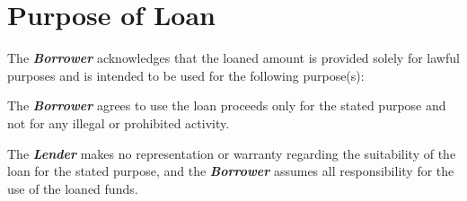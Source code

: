 
\section{Purpose of Loan}
\label{sec:loanpurpose}

The \textbf{\textit{Borrower}} acknowledges that the loaned amount is provided solely for lawful purposes and is intended to be used for the following purpose(s):

\vspace{0.3cm}

\noindent \LoanPurpose{}

\vspace{0.3cm}

\noindent The \textbf{\textit{Borrower}} agrees to use the loan proceeds only for the stated purpose and not for any illegal or prohibited activity. 

\vspace{0.3cm}

\noindent The \textbf{\textit{Lender}} makes no representation or warranty regarding the suitability of the loan for the stated purpose, and the \textbf{\textit{Borrower}} assumes all responsibility for the use of the loaned funds.

